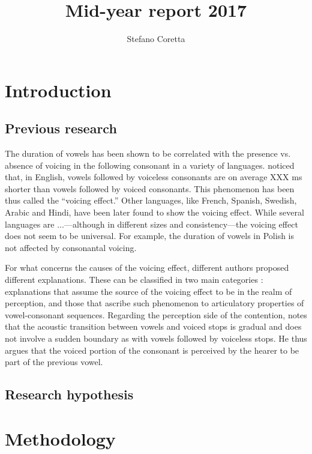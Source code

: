 \documentclass[a4paper]{article}\usepackage[]{graphicx}\usepackage[]{color}
\title{Mid-year report 2017}
\author{Stefano Coretta}
\begin{document}
\maketitle

\tableofcontents

\section{Introduction}


\subsection{Previous research}

The duration of vowels has been shown to be correlated with the presence vs. absence of voicing in the following consonant in a variety of languages.
\citet{house1953} noticed that, in English, vowels followed by voiceless consonants are on average XXX ms shorter than vowels followed by voiced consonants.
This phenomenon has been thus called the ``voicing effect.''
Other languages, like French, Spanish, Swedish, Arabic and Hindi, have been later found to show the voicing effect.
While several languages are ...---although in different sizes and consistency---the voicing effect does not seem to be universal.
For example, the duration of vowels in Polish is not affected by consonantal voicing.

For what concerns the causes of the voicing effect, different authors proposed different explanations.
These can be classified in two main categories \citep{soskuthy2013}: explanations that assume the source of the voicing effect to be in the realm of perception, and those that ascribe such phenomenon to articulatory properties of vowel-consonant sequences.
Regarding the perception side of the contention, \citet{javkin1976} notes that the acoustic transition between vowels and voiced stops is gradual and does not involve a sudden boundary as with vowels followed by voiceless stops.
He thus argues that the voiced portion of the consonant is perceived by the hearer to be part of the previous vowel.



\subsection{Research hypothesis}


\section{Methodology}
\end{document}
